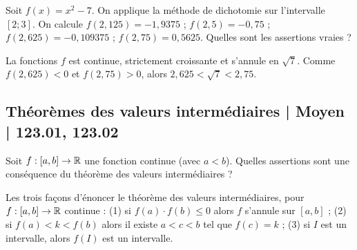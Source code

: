 \begin{question}
Soit $f(x)=x^2-7$. On applique la méthode de dichotomie sur l'intervalle $[2 ; 3]$. 
On calcule $f(2,125)=-1,9375$ ; $f(2,5) = -0,75$ ; $f(2,625) = -0,109375$ ; $f(2,75) = 0,5625$. Quelles sont les assertions vraies ?
\begin{answers}




\end{answers}
\begin{explanations}
La fonctions $f$ est continue, strictement croissante et s'annule en $\sqrt{7}$. 
Comme $f(2,625) < 0$ et $f(2,75) > 0$, alors
$2,625 < \sqrt{7} < 2,75$.
\end{explanations}
\end{question}




\subsection{Théorèmes des valeurs intermédiaires | Moyen | 123.01, 123.02}

\begin{question}
Soit $f : [a,b] \to \mathbb{R}$ une fonction continue (avec $a < b$). Quelles assertions sont une conséquence du théorème des valeurs intermédiaires ?
\begin{answers}



    \bad{Si $c \in ]a,b[$ alors $f(c) \in ]f(a),f(b)[$.}
\end{answers}
\begin{explanations}
Les trois façons d'énoncer le théorème des valeurs intermédiaires, pour $f : [a,b] \to \mathbb{R}$ continue :
(1) si $f(a) \cdot f(b) \le 0$ alors $f$ s'annule sur $[a,b]$ ;
(2) si $f(a) < k < f(b)$ alors il existe $a < c < b$ tel que $f(c)=k$ ;
(3) si $I$ est un intervalle, alors $f(I)$ est un intervalle.
\end{explanations}
\end{question}



